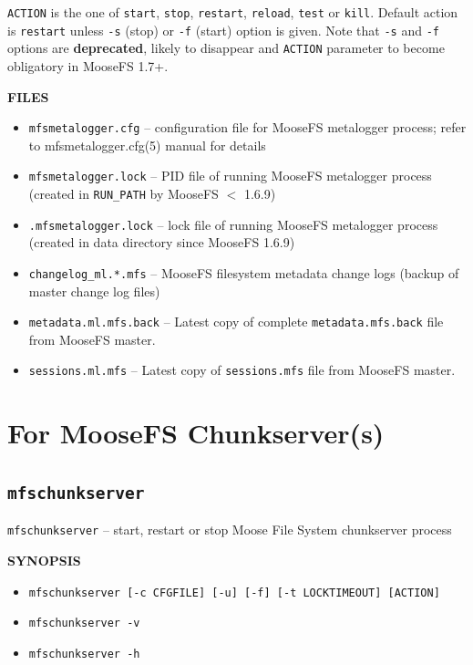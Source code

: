 \documentclass[a4paper,11pt,english]{report}
\def\code#1{\texttt{#1}}
\begin{document}
				\code{ACTION} is the one of \code{start},  \code{stop},  \code{restart},  \code{reload},  \code{test}  or  \code{kill}. Default action is \code{restart} unless \code{-s} (stop) or \code{-f} (start) option is given. Note that \code{-s} and \code{-f} options are \textbf{deprecated}, likely to disappear and \code{ACTION} parameter to become obligatory in MooseFS 1.7+.
				\newpage
				
				\textbf{FILES}
				\begin{itemize}	
					\item \code{mfsmetalogger.cfg} -- configuration file for MooseFS metalogger process; refer to mfsmetalogger.cfg(5) manual for details
					\item \code{mfsmetalogger.lock} -- PID  file  of  running  MooseFS metalogger  process (created in \code{RUN\_PATH} by MooseFS $<$ 1.6.9)
					\item \code{.mfsmetalogger.lock} -- lock file of running MooseFS metalogger process (created in data directory since MooseFS 1.6.9)
					\item \code{changelog\_ml.*.mfs} -- MooseFS filesystem metadata change logs (backup of master change log files)
					\item \code{metadata.ml.mfs.back} -- Latest copy of complete \code{metadata.mfs.back} file from MooseFS master.
					\item \code{sessions.ml.mfs} -- Latest copy of \code{sessions.mfs} file from MooseFS master.
				\end{itemize}
				
				
		\section{For MooseFS Chunkserver(s)}
			\subsection{\code{mfschunkserver}}
				\code{mfschunkserver}  --  start, restart or stop Moose File System chunkserver process

				\bigskip
				\textbf{SYNOPSIS}
				\begin{itemize}
					\item \code{mfschunkserver [-c CFGFILE] [-u] [-f] [-t LOCKTIMEOUT] [ACTION]}
					\item \code{mfschunkserver -v}
					\item \code{mfschunkserver -h}
				\end{itemize}
				
\end{document}
